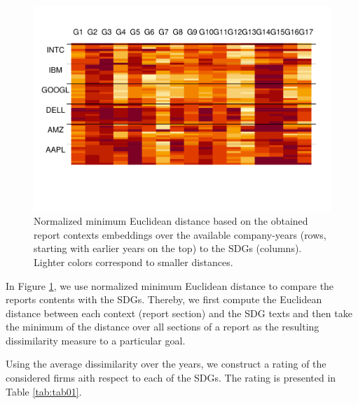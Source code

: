\documentclass[
]{article}
\begin{document}
\begin{figure}
\centering
\includegraphics{20210219_sustain_dim_files/figure-latex/figeucl-1.pdf}
\caption{\label{fig:figeucl}Normalized minimum Euclidean distance based on the obtained report contexts embeddings over the available company-years (rows, starting with earlier years on the top) to the SDGs (columns). Lighter colors correspond to smaller distances.}
\end{figure}

In Figure \ref{fig:figeucl}, we use normalized minimum Euclidean distance to compare the reports contents with the SDGs. Thereby, we first compute the Euclidean distance between each context (report section) and the SDG texts and then take the minimum of the distance over all sections of a report as the resulting dissimilarity measure to a particular goal.

Using the average dissimilarity over the years, we construct a rating of the considered firms aith respect to each of the SDGs. The rating is presented in Table \ref{tab:tab01}.
\end{document}
